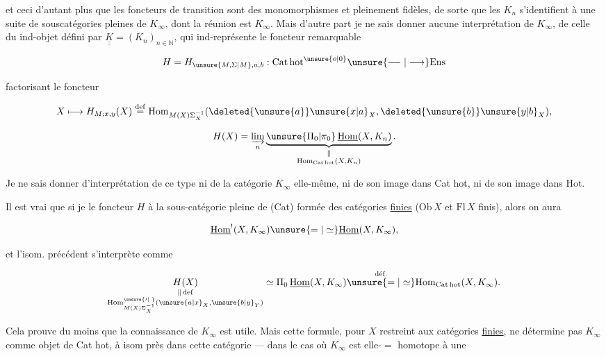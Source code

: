 et ceci d'autant plus que les foncteurs de transition sont des monomorphismes et pleinement fidèles, de sorte que  les $K_n$ s'identifient à une suite de souscatégories pleines de $K_\infty$, dont la réunion est $K_\infty$. Mais d'autre part je ne sais donner aucune interprétation  de $K_\infty$,   de celle du ind-objet  défini par $\underline{\underline K}=(K_n)_{n\in\mathbb N}$, qui ind-représente le foncteur remarquable

\[
 H=H_{\unsure{M,\Sigma|M},a,b}:\mathrm{Cat\,hot}^{\unsure{o|0}}
 \unsure{\relbar\joinrel\relbar|\longrightarrow}\mathrm{Ens}
\]

factorisant le foncteur


\[
 X\longmapsto H_{M;x,y}(X)\overset{\mathrm{def}}{=}
 \mathrm{Hom}_{M(X)\Sigma_X^{-1}}(\deleted{\unsure{a}}\unsure{x|a}_X,\deleted{\unsure{b}}\unsure{y|b}_X),
\]

 

\[
 H(X)=\varinjlim_n
 \underbrace{\unsure{\Pi_0|\pi_0}\,\underline{\mathrm{Hom}}(X,K_n)}_{\substack{\Vert\\\mathrm{Hom}_{\mathrm{Cat\,hot}}(X,K_n)}} .
\]

Je ne sais donner d'interprétation de ce type ni de la catégorie $K_\infty$ elle-même, ni de son image dans Cat hot, ni de son image dans Hot.

Il est vrai que si je  le foncteur $H$ à  la sous-catégorie pleine de (Cat) formée des catégories \uline{finies} ($\mathrm{Ob}\,X$ et $\mathrm{Fl}\,X$ finis), alors on aura

\[
 \underline{\mathrm{Hom}}^{!}(X,K_\infty)\unsure{=|\simeq}\underline{\mathrm{Hom}}(X,K_\infty),
\]

et l'isom. précédent s'interprète comme

\[
 \underset{\substack{\Vert\,\mathrm{def}\\
 \mathrm{Hom}^{\unsure{\prime|\;}}_{M(X)\Sigma_X^{-1}}(\unsure{a|x}_X,\unsure{b|y}_Y)}}{H(X)}
 \simeq\Pi_0\,\underline{\mathrm{Hom}}(X,K_\infty)\overset{\text{déf.}}{\unsure{=|\simeq}}
 \mathrm{Hom}_{\mathrm{Cat\,hot}}(X,K_\infty).
\]

 Cela prouve du moins que la connaissance de $K_\infty$ est utile. Mais cette formule, pour $X$ restreint aux catégories \uline{finies}, ne détermine pas $K_\infty$  comme objet de Cat hot, à isom  près dans cette catégorie ---  dans le cas   où $K_\infty$ est elle-$=$  homotope à une 

